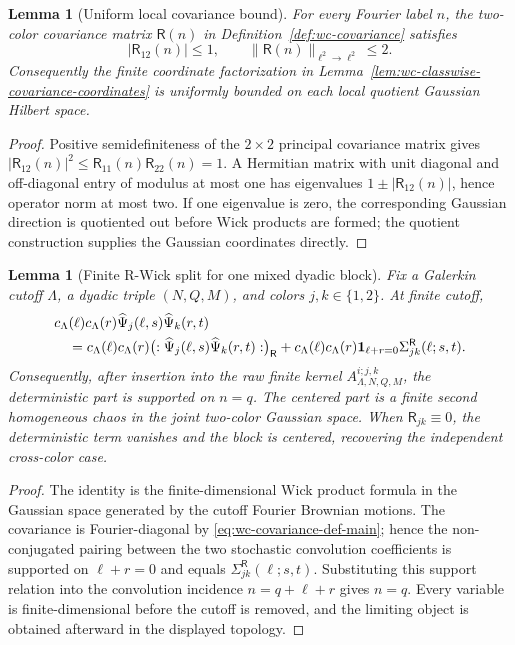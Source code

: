 \documentclass[10pt]{amsart}
\numberwithin{equation}{section}
\theoremstyle{plain}
\newtheorem{lemma}[theorem]{Lemma}
\theoremstyle{definition}
\theoremstyle{remark}
\begin{document}
\begin{lemma}[Uniform local covariance bound]\label{lem:wc-local-covariance-bound}
For every Fourier label \(n\), the two-color covariance matrix \(\mathsf R(n)\) in Definition~\ref{def:wc-covariance} satisfies
\[
        |\mathsf R_{12}(n)|\le1,
        \qquad
        \|\mathsf R(n)\|_{\ell^2\to\ell^2}\le2.
\]
Consequently the finite coordinate factorization in Lemma~\ref{lem:wc-classwise-covariance-coordinates} is uniformly bounded on each local quotient Gaussian Hilbert space.
\end{lemma}

\begin{proof}
Positive semidefiniteness of the \(2\times2\) principal covariance matrix gives \(|\mathsf R_{12}(n)|^2\le \mathsf R_{11}(n)\mathsf R_{22}(n)=1\).  A Hermitian matrix with unit diagonal and off-diagonal entry of modulus at most one has eigenvalues \(1\pm |\mathsf R_{12}(n)|\), hence operator norm at most two.  If one eigenvalue is zero, the corresponding Gaussian direction is quotiented out before Wick products are formed; the quotient construction supplies the Gaussian coordinates directly.
\end{proof}


\begin{lemma}[Finite R-Wick split for one mixed dyadic block]\label{lem:wc-finite-wick-block}
Fix a Galerkin cutoff \(\Lambda\), a dyadic triple \((N,Q,M)\), and colors \(j,k\in\{1,2\}\).  At finite cutoff,
\begin{align}\label{eq:wc-finite-wick-block}
&c_\Lambda(\ell)c_\Lambda(r)\widehat\Psi_j(\ell,s)\widehat\Psi_k(r,t)\\
&\quad=c_\Lambda(\ell)c_\Lambda(r)\bigl(:\widehat\Psi_j(\ell,s)\widehat\Psi_k(r,t):\bigr)_{\mathsf R}
+c_\Lambda(\ell)c_\Lambda(r)\mathbf 1_{\ell+r=0}\Sigma_{jk}^{\mathsf R}(\ell;s,t).\notag
\end{align}
Consequently, after insertion into the raw finite kernel \(A_{\Lambda,N,Q,M}^{i;j,k}\), the deterministic part is supported on \(n=q\).  The centered part is a finite second homogeneous chaos in the joint two-color Gaussian space.  When \(\mathsf R_{jk}\equiv0\), the deterministic term vanishes and the block is centered, recovering the independent cross-color case.
\end{lemma}

\begin{proof}
The identity is the finite-dimensional Wick product formula in the Gaussian space generated by the cutoff Fourier Brownian motions.  The covariance is Fourier-diagonal by \eqref{eq:wc-covariance-def-main}; hence the non-conjugated pairing between the two stochastic convolution coefficients is supported on \(\ell+r=0\) and equals \(\Sigma_{jk}^{\mathsf R}(\ell;s,t)\).  Substituting this support relation into the convolution incidence \(n=q+\ell+r\) gives \(n=q\).  Every variable is finite-dimensional before the cutoff is removed, and the limiting object is obtained afterward in the displayed topology.
\end{proof}
\end{document}
